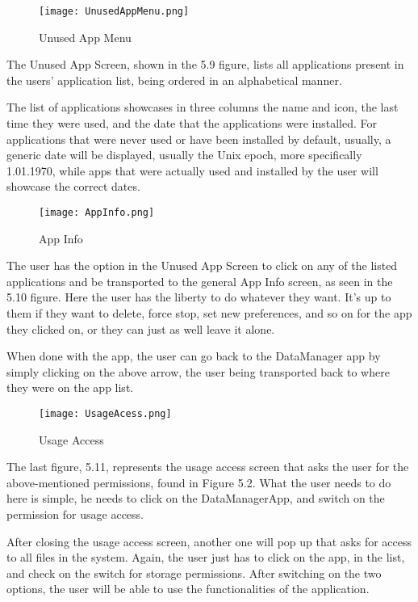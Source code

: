 \begin{figure}[htp]
    \centering
    \texttt{[image: UnusedAppMenu.png]}
    \caption{Unused App Menu}
    \label{fig: Unused App Menu}
\end{figure}

The Unused App Screen, shown in the 5.9 figure, lists all applications present in the users' application list, being ordered in an alphabetical manner. 

The list of applications showcases in three columns the name and icon, the last time they were used, and the date that the applications were installed. For applications that were never used or have been installed by default, usually, a generic date will be displayed, usually the Unix epoch, more specifically 1.01.1970, while apps that were actually used and installed by the user will showcase the correct dates.

\newpage
\begin{figure}[htp]
    \centering
    \texttt{[image: AppInfo.png]}
    \caption{App Info}
    \label{fig: App Info}
\end{figure}

The user has the option in the Unused App Screen to click on any of the listed applications and be transported to the general App Info screen, as seen in the 5.10 figure. Here the user has the liberty to do whatever they want. It's up to them if they want to delete, force stop, set new preferences, and so on for the app they clicked on, or they can just as well leave it alone.

When done with the app, the user can go back to the DataManager app by simply clicking on the above arrow, the user being transported back to where they were on the app list.
\newpage
\begin{figure}[htp]
    \centering
    \texttt{[image: UsageAcess.png]}
    \caption{Usage Access}
    \label{fig: Usage Access}
\end{figure}


The last figure, 5.11, represents the usage access screen that asks the user for the above-mentioned permissions, found in Figure 5.2. What the user needs to do here is simple, he needs to click on the DataManagerApp, and switch on the permission for usage access. 

After closing the usage access screen, another one will pop up that asks for access to all files in the system. Again, the user just has to click on the app, in the list, and check on the switch for storage permissions. After switching on the two options, the user will be able to use the functionalities of the application.
\newpage
